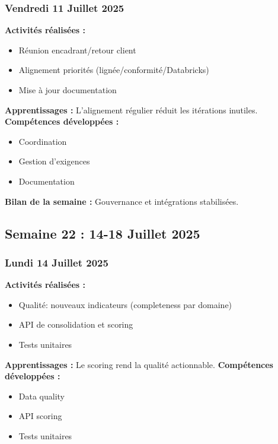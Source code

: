 \documentclass[12pt,a4paper]{article}
\begin{document}
\subsubsection{Vendredi 11 Juillet 2025}
\textbf{Activités réalisées :}
\begin{itemize}
    \item Réunion encadrant/retour client
    \item Alignement priorités (lignée/conformité/Databricks)
    \item Mise à jour documentation
\end{itemize}
\textbf{Apprentissages :} L'alignement régulier réduit les itérations inutiles.
\textbf{Compétences développées :}
\begin{itemize}
    \item Coordination
    \item Gestion d'exigences
    \item Documentation
\end{itemize}
\textbf{Bilan de la semaine :} Gouvernance et intégrations stabilisées.

\clearpage
\subsection{Semaine 22 : 14-18 Juillet 2025}

\subsubsection{Lundi 14 Juillet 2025}
\textbf{Activités réalisées :}
\begin{itemize}
    \item Qualité: nouveaux indicateurs (completeness par domaine)
    \item API de consolidation et scoring
    \item Tests unitaires
\end{itemize}
\textbf{Apprentissages :} Le scoring rend la qualité actionnable.
\textbf{Compétences développées :}
\begin{itemize}
    \item Data quality
    \item API scoring
    \item Tests unitaires
\end{itemize}
\end{document}
